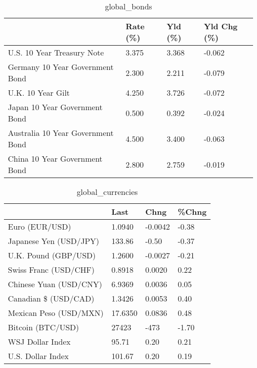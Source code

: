 \documentclass{article}%
\begin{document}
%


\begin{table}[htbp]%
\caption{global\_bonds}%
\centering%
\begin{adjustbox}{width=1\textwidth}%
\begin{tabular}{llll}
\toprule
                                  & Rate (\%) & Yld (\%) & Yld Chg (\%) \\
\midrule
       U.S. 10 Year Treasury Note &    3.375 &   3.368 &      -0.062 \\
  Germany 10 Year Government Bond &    2.300 &   2.211 &      -0.079 \\
                U.K. 10 Year Gilt &    4.250 &   3.726 &      -0.072 \\
    Japan 10 Year Government Bond &    0.500 &   0.392 &      -0.024 \\
Australia 10 Year Government Bond &    4.500 &   3.400 &      -0.063 \\
    China 10 Year Government Bond &    2.800 &   2.759 &      -0.019 \\
\bottomrule
\end{tabular}
%
\end{adjustbox}%
\end{table}

%


\begin{table}[htbp]%
\caption{global\_currencies}%
\centering%
\begin{adjustbox}{width=1\textwidth}%
\begin{tabular}{llll}
\toprule
                       &    Last &    Chng & \%Chng \\
\midrule
        Euro (EUR/USD) &  1.0940 & -0.0042 & -0.38 \\
Japanese Yen (USD/JPY) &  133.86 &   -0.50 & -0.37 \\
  U.K. Pound (GBP/USD) &  1.2600 & -0.0027 & -0.21 \\
 Swiss Franc (USD/CHF) &  0.8918 &  0.0020 &  0.22 \\
Chinese Yuan (USD/CNY) &  6.9369 &  0.0036 &  0.05 \\
  Canadian \$ (USD/CAD) &  1.3426 &  0.0053 &  0.40 \\
Mexican Peso (USD/MXN) & 17.6350 &  0.0836 &  0.48 \\
     Bitcoin (BTC/USD) &   27423 &    -473 & -1.70 \\
      WSJ Dollar Index &   95.71 &    0.20 &  0.21 \\
     U.S. Dollar Index &  101.67 &    0.20 &  0.19 \\
\bottomrule
\end{tabular}
%
\end{adjustbox}%
\end{table}
\end{document}
